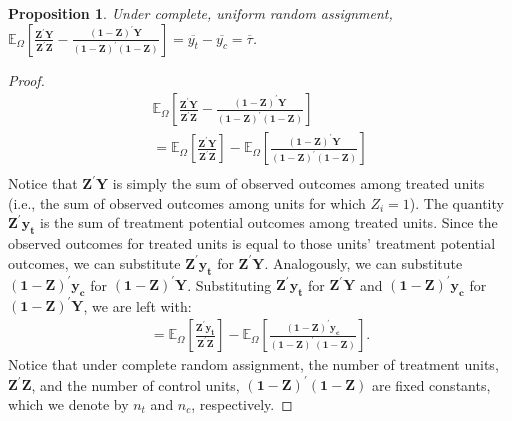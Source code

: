 \documentclass[12pt,leqno]{article}
\theoremstyle{newstyle}
\newtheorem{prop}[thm]{Proposition}
\begin{document}
\begin{prop} \label{prop: complete ran assign}
Under complete, uniform random assignment, $\mathbb{E}_{\Omega} \left[\frac{\mathbf{Z}^{\prime}\mathbf{Y}}{\mathbf{Z}^{\prime}\mathbf{Z}} - \frac{(\mathbf{1} - \mathbf{Z})^{\prime} \mathbf{Y}}{(\mathbf{1} - \mathbf{Z})^{\prime}(\mathbf{1} - \mathbf{Z})}\right] = \overline{y_{t}} - \overline{y_{c}} = \overline{\tau}$.
\end{prop}
\begin{proof}
\begin{align*}
\mathbb{E}_{\Omega} \left[\frac{\mathbf{Z}^{\prime}\mathbf{Y}}{\mathbf{Z}^{\prime}\mathbf{Z}} - \frac{(\mathbf{1} - \mathbf{Z})^{\prime} \mathbf{Y}}{(\mathbf{1} - \mathbf{Z})^{\prime}(\mathbf{1} - \mathbf{Z})}\right] \\
= \mathbb{E}_{\Omega} \left[\frac{\mathbf{Z}^{\prime}\mathbf{Y}}{\mathbf{Z}^{\prime}\mathbf{Z}}\right] - \mathbb{E}_{\Omega}\left[\frac{(\mathbf{1} - \mathbf{Z})^{\prime} \mathbf{Y}}{(\mathbf{1} - \mathbf{Z})^{\prime}(\mathbf{1} - \mathbf{Z})}\right] \\
\end{align*}
Notice that $\mathbf{Z}^{\prime}\mathbf{Y}$ is simply the sum of observed outcomes among treated units (i.e., the sum of observed outcomes among units for which $Z_i = 1$). The quantity $\mathbf{Z}^{\prime}\mathbf{y_t}$ is the sum of treatment potential outcomes among treated units. Since the observed outcomes for treated units is equal to those units' treatment potential outcomes, we can substitute $\mathbf{Z}^{\prime}\mathbf{y_t}$ for $\mathbf{Z}^{\prime}\mathbf{Y}$. Analogously, we can substitute $\left(\mathbf{1} - \mathbf{Z}\right)^{\prime}\mathbf{y_c}$ for $\left(\mathbf{1} - \mathbf{Z}\right)^{\prime}\mathbf{Y}$.
Substituting $\mathbf{Z}^{\prime}\mathbf{y_t}$ for $\mathbf{Z}^{\prime}\mathbf{Y}$ and $\left(\mathbf{1} - \mathbf{Z}\right)^{\prime}\mathbf{y_c}$ for $\left(\mathbf{1} - \mathbf{Z}\right)^{\prime}\mathbf{Y}$, we are left with:
\begin{align*}
= \mathbb{E}_{\Omega} \left[\frac{\mathbf{Z}^{\prime} \mathbf{y_t}}{\mathbf{Z}^{\prime}\mathbf{Z}}\right] - \mathbb{E}_{\Omega}\left[\frac{(\mathbf{1} - \mathbf{Z})^{\prime} \mathbf{y_c}}{(\mathbf{1} - \mathbf{Z})^{\prime}(\mathbf{1} - \mathbf{Z})}\right].
\end{align*}
Notice that under complete random assignment, the number of treatment units, $\mathbf{Z}^{\prime}\mathbf{Z}$, and the number of control units, $\left(\mathbf{1} - \mathbf{Z}\right)^{\prime}\left(\mathbf{1} - \mathbf{Z}\right)$ are fixed constants, which we denote by $n_t$ and $n_c$, respectively.

\end{proof}
\end{document}
